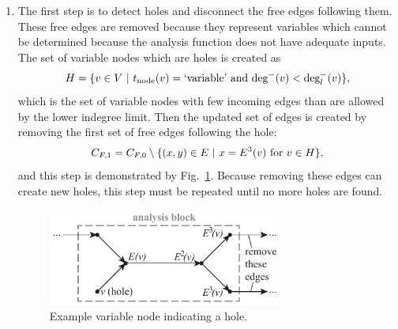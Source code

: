 \begin{enumerate}
\item The first step is to detect holes and disconnect the free edges following them. These free edges are removed because they represent variables which cannot be determined because the analysis function does not have adequate inputs. The set of variable nodes which are holes is created as
\begin{equation}
H = \{v \in V \ | \  t_\textrm{node}(v) = \textrm{`variable'} \textrm{ and } \textrm{deg}^-(v) < \textrm{deg}_l^-(v) \},
\end{equation}
which is the set of variable nodes with few incoming edges than are allowed by the lower indegree limit.
Then the updated set of edges is created by removing the first set of free edges following the hole:
\begin{equation}
C_{F,1} = C_{F,0} \setminus \{(x,y) \in E \ | \  x=E^3(v) \textrm{ for } v \in H\},
\end{equation}
and this step is demonstrated by Fig.~\ref{f:hole}. Because removing these edges can create new holes, this step must be repeated until no more holes are found.
\begin{figure}[htb!]
	\begin{center}
	\includegraphics[width=3in]{images/analysis_block_hole}
	\end{center}
	\vspace{-20pt}
\caption{Example variable node indicating a hole.}
\label{f:hole}
\end{figure}



\end{enumerate}
